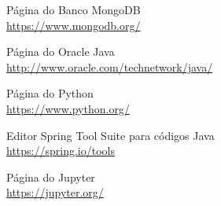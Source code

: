 \documentclass[a4paper,11pt]{article}
\begin{document}



\begin{thebibliography}{8}
  Página do Banco MongoDB \\
  \url{https://www.mongodb.org/}

  Página do Oracle Java \\
  \url{http://www.oracle.com/technetwork/java/}
  
  Página do Python \\
  \url{https://www.python.org/}

  Editor Spring Tool Suite para códigos Java \\
  \url{https://spring.io/tools}

  Página do Jupyter \\
  \url{https://jupyter.org/}

  
\end{thebibliography}
  
\end{document}
